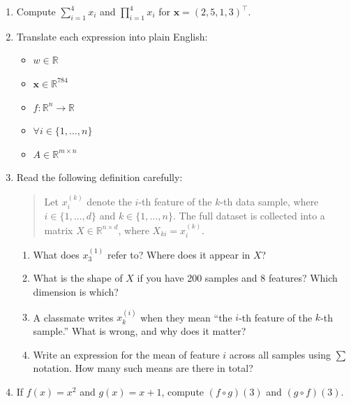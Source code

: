 \documentclass[12pt, a4paper]{scrartcl}
\begin{document}
\begin{enumerate}

    \item Compute $\displaystyle\sum_{i=1}^{4} x_i$ and $\displaystyle\prod_{i=1}^{4} x_i$
    for $\mathbf{x} = (2, 5, 1, 3)^\top$.

\item Translate each expression into plain English:

\begin{itemize}
    \item $w \in \mathbb{R}$
    \item $\mathbf{x} \in \mathbb{R}^{784}$
    \item $f: \mathbb{R}^n \to \mathbb{R}$
    \item $\forall i \in \{1, \ldots, n\}$
    \item $A \in \mathbb{R}^{m \times n}$
\end{itemize}

\item Read the following definition carefully:

\begin{quote}
Let $x_i^{(k)}$ denote the $i$-th feature of the $k$-th data sample, where $i
\in \{1, \ldots, d\}$ and $k \in \{1, \ldots, n\}$. The full dataset is
collected into a matrix $X \in \mathbb{R}^{n \times d}$, where $X_{ki} =
x_i^{(k)}$.
\end{quote}

\begin{enumerate}

    \item What does $x_3^{(1)}$ refer to? Where does it appear in $X$?

    \item What is the shape of $X$ if you have 200 samples and 8 features?
    Which dimension is which?

    \item A classmate writes $x_k^{(i)}$ when they mean ``the $i$-th feature of
    the $k$-th sample.'' What is wrong, and why does it matter?

    \item Write an expression for the mean of feature $i$ across all samples
    using $\sum$ notation. How many such means are there in total?

\end{enumerate}


    \item If $f(x) = x^2$ and $g(x) = x + 1$, compute $(f \circ g)(3)$ and
    $(g \circ f)(3)$.


\end{enumerate}
\end{document}
